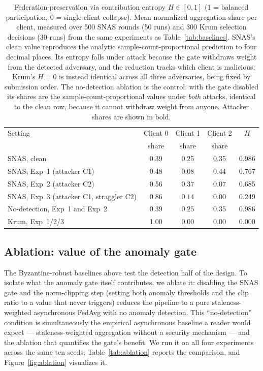 \documentclass[pdflatex,sn-mathphys-num]{sn-jnl}
\begin{document}
\begin{table}[t]
\caption{Federation-preservation via contribution entropy $H\in[0,1]$ ($1$ = balanced participation, $0$ = single-client collapse). Mean normalized aggregation share per client, measured over 500 SNAS rounds (50 runs) and 300 Krum selection decisions (30 runs) from the same experiments as Table~\ref{tab:baselines}. SNAS's clean value reproduces the analytic sample-count-proportional prediction to four decimal places. Its entropy falls under attack because the gate withdraws weight from the detected adversary, and the reduction tracks which client is malicious; Krum's $H=0$ is instead identical across all three adversaries, being fixed by submission order. The no-detection ablation is the control: with the gate disabled its shares are the sample-count-proportional values under \emph{both} attacks, identical to the clean row, because it cannot withdraw weight from anyone. Attacker shares are shown in bold.}
\label{tab:entropy}
\centering
\begin{tabular}{lcccc}
\toprule
Setting & Client 0 & Client 1 & Client 2 & $H$ \\
 & share & share & share & \\
\midrule
SNAS, clean                & 0.39 & 0.25 & 0.35 & 0.986 \\
SNAS, Exp~1 (attacker C1)  & 0.48 & $\mathbf{0.08}$ & 0.44 & 0.767 \\
SNAS, Exp~2 (attacker C2)  & 0.56 & 0.37 & $\mathbf{0.07}$ & 0.685 \\
SNAS, Exp~3 (attacker C1, straggler C2) & 0.86 & $\mathbf{0.14}$ & 0.00 & 0.249 \\
\midrule
No-detection, Exp~1 and Exp~2 & 0.39 & 0.25 & 0.35 & 0.986 \\
Krum, Exp~1/2/3            & 1.00 & 0.00 & 0.00 & 0.000 \\
\bottomrule
\end{tabular}
\end{table}

\subsection{Ablation: value of the anomaly gate}

The Byzantine-robust baselines above test the detection half of the design. To isolate what the anomaly gate itself contributes, we ablate it: disabling the SNAS gate and the norm-clipping step (setting both anomaly thresholds and the clip ratio to a value that never triggers) reduces the pipeline to a pure staleness-weighted asynchronous FedAvg with no anomaly detection. This ``no-detection'' condition is simultaneously the empirical asynchronous baseline a reader would expect --- staleness-weighted aggregation without a security mechanism --- and the ablation that quantifies the gate's benefit. We run it on all four experiments across the same ten seeds; Table~\ref{tab:ablation} reports the comparison, and Figure~\ref{fig:ablation} visualizes it.
\end{document}
